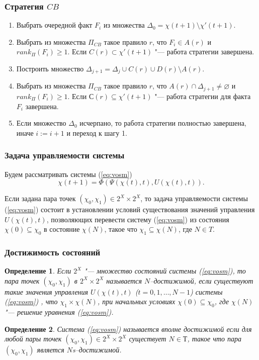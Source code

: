 \documentclass[default]{beamer}
\newtheorem{Def}{Определение}
\begin{document}
	\begin{frame}
		\frametitle{Стратегия $CB$}
		
		\begin{enumerate}
			\item Выбрать очередной факт $F_i$ из множества  $\Delta_0 = \chi(t+1)\setminus\chi'(t+1)$.
			\item Выбрать из множества $\Pi_{CB}$ такое правило $r$, что $F_i\in A(r)$ и $rank_{\Pi}(F_i)\geqslant 1$. Если $C(r)\subset\chi'(t+1)$ "--- работа стратегии завершена.
			\item Построить множество $\Delta_{j+1} = \Delta_j \cup C(r)\cup D(r)\setminus A(r)$.
			\item Выбрать из множества $\Pi_{CB}$ такое правило $r$, что $A(r)\cap\Delta_{j+1}\not=\varnothing$ и $rank_{\Pi}(F_i)\geqslant 1$. Если $С(r)\subseteq\chi'(t+1)$ "--- работа стратегии для факта $F_i$ завершена.
			\item Если множество $\Delta_0$ исчерпано, то работа стратегии полностью завершена, иначе $i := i+1$ и переход к шагу 1.
		\end{enumerate}
	\end{frame}	
		
	\begin{frame}
		\frametitle{Задача управляемости системы}
		
		Будем рассматривать системы (\ref{eq:vosm})
		\[
		\chi(t+1)=\Phi(\Psi(\chi(t),t),U(\chi(t),t)).
		\]
		\par\bigskip
		Если задана пара точек $(\chi_0, \chi_1)\in 2^X\times 2^X$, то задача управляемости системы (\ref*{eq:vosm}) состоит в установлении условий существования значений управления $U(\chi(t),t)$, позволяющих перевести систему (\ref*{eq:vosm}) из состояния $\chi(0)\subseteq\chi_0$ в состояние $\chi(N)$, такое что $\chi_1\subseteq\chi(N)$, где $N\in T$.
	\end{frame}

		
	\begin{frame}
		\frametitle{Достижимость состояний}
		
		\begin{Def}
			Если $2^X$ "--- множество состояний системы (\ref{eq:vosm}), то пара точек $(\chi_0, \chi_1)$ в $2^X\times 2^X$  называется $N$–достижимой, если  существуют такие значения управления $U(\chi(t),t)$ ($t=0,1,\dots,N-1$) системы (\ref{eq:vosm}) , что $\chi_1\times\chi(N)$, при начальных условиях $\chi(0)\subseteq\chi_0$, где $\chi(N)$ "--- решение уравнения (\ref{eq:vosm}).
		\end{Def}
		\begin{Def}
			Система (\ref{eq:vosm}) называется вполне достижимой если для любой пары точек  $(\chi_0, \chi_1)\in 2^X\times 2^X$  существует $N\in Т$, такое что пара $(\chi_0, \chi_1)$ является $N$s–достижимой.
		\end{Def}
	\end{frame}
\end{document}
